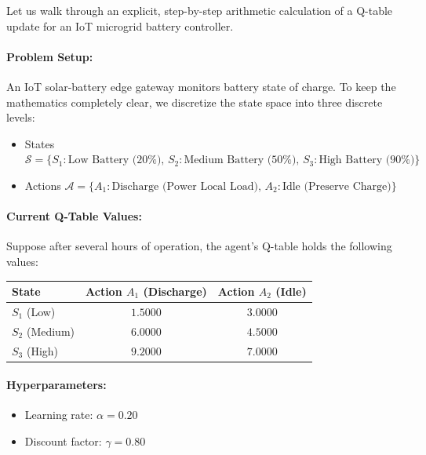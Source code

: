 \begin{example}
Let us walk through an explicit, step-by-step arithmetic calculation of a Q-table update for an IoT microgrid battery controller.

\paragraph{Problem Setup:}
An IoT solar-battery edge gateway monitors battery state of charge. To keep the mathematics completely clear, we discretize the state space into three discrete levels:
\begin{itemize}
    \item States $\mathcal{S} = \{S_1: \text{Low Battery (20\%)},\, S_2: \text{Medium Battery (50\%)},\, S_3: \text{High Battery (90\%)}\}$
    \item Actions $\mathcal{A} = \{A_1: \text{Discharge (Power Local Load)},\, A_2: \text{Idle (Preserve Charge)}\}$
\end{itemize}

\paragraph{Current Q-Table Values:}
Suppose after several hours of operation, the agent's Q-table holds the following values:
\begin{center}
\begin{tabular}{lcc}
\toprule
\textbf{State} & \textbf{Action $A_1$ (Discharge)} & \textbf{Action $A_2$ (Idle)} \\
\midrule
$S_1$ (Low)    & $1.5000$ & $3.0000$ \\
$S_2$ (Medium) & $6.0000$ & $4.5000$ \\
$S_3$ (High)   & $9.2000$ & $7.0000$ \\
\bottomrule
\end{tabular}
\end{center}

\paragraph{Hyperparameters:}
\begin{itemize}
    \item Learning rate: $\alpha = 0.20$
    \item Discount factor: $\gamma = 0.80$
\end{itemize}


\end{example}
